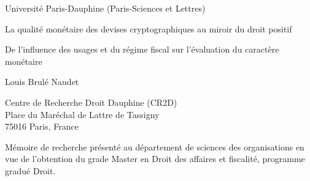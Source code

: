 
\begin{titlepage}
\begin{center}
{Université Paris-Dauphine (Paris-Sciences et Lettres)} \vspace{1.5 cm}\\
\end{center}
\begin{center}
\Huge{La qualité monétaire des devises cryptographiques au miroir du droit positif}
\end{center}
\vspace{0cm}
\begin{center}
\Large{De l'influence des usages et du régime fiscal sur l'évaluation du caractère monétaire}
\end{center}
\vspace{1.5 cm}
\begin{center}
\normalsize{Louis Brulé Naudet}
\vspace{3.5 cm}
\end{center}
\begin{center}
Centre de Recherche Droit Dauphine (CR2D)\\
Place du Maréchal de Lattre de Tassigny\\
75016 Paris, France
\end{center}
\vspace{1.5 cm}
\begin{center}
Mémoire de recherche présenté au département de sciences des organisations en vue de l'obtention du grade Master en Droit des affaires et fiscalité, programme gradué Droit.
\end{center}
\vspace{1.5 cm}
\end{titlepage}
\emptypage
\nobibliography*
